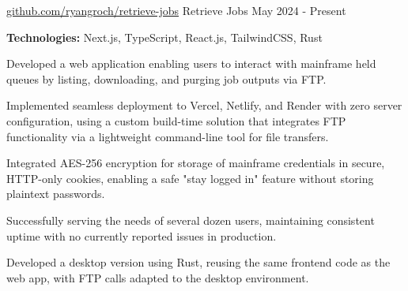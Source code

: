 

\begin{cventries}


  \cventry
  {\href{https://github.com/ryangroch/retrieve-jobs}{github.com/ryangroch/retrieve-jobs}} %
  {Retrieve Jobs} %
  {May 2024 - Present} %
  {} %
  {
    \begin{cvitems} %
      \item {\textbf{Technologies:} Next.js, TypeScript, React.js, TailwindCSS, Rust}
      \item {Developed a web application enabling users to interact with mainframe held queues by listing, downloading, and purging job outputs via FTP.}
      \item {Implemented seamless deployment to Vercel, Netlify, and Render with zero server configuration, using a custom build-time solution that integrates FTP functionality via a lightweight command-line tool for file transfers.}
      \item {Integrated AES-256 encryption for storage of mainframe credentials in secure, HTTP-only cookies, enabling a safe "stay logged in" feature without storing plaintext passwords.}
      \item {Successfully serving the needs of several dozen users, maintaining consistent uptime with no currently reported issues in production.}
      \item {Developed a desktop version using Rust, reusing the same frontend code as the web app, with FTP calls adapted to the desktop environment.}
    \end{cvitems}
  }


\end{cventries}
